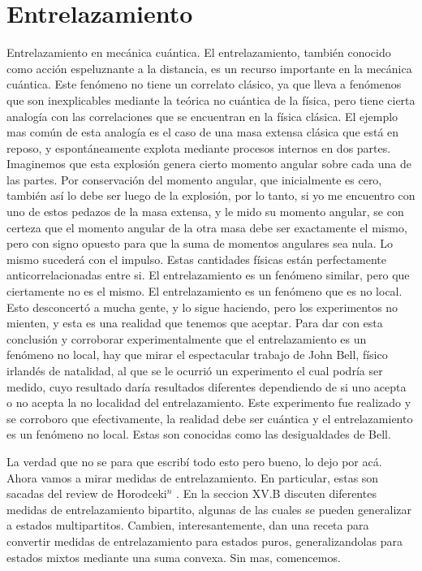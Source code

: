 \chapter{Entrelazamiento}
\label{ch2_entrelazamiento}


\pagestyle{fancy}
\fancyhf{}
\fancyhead[LE]{\nouppercase{\rightmark\hfill}}
\fancyhead[RO]{\nouppercase{\leftmark\hfill}}
\fancyfoot[LE,RO]{\hfill\thepage\hfill}

Entrelazamiento en mecánica cuántica. El entrelazamiento, también conocido como acción espeluznante a la distancia, es un recurso importante en la mecánica cuántica. Este fenómeno no tiene un correlato clásico, ya que lleva a fenómenos que son inexplicables mediante la teórica no cuántica de la física, pero tiene cierta analogía con las correlaciones que se encuentran en la física clásica. El ejemplo mas común de esta analogía es el caso de una masa extensa clásica que está en reposo, y espontáneamente explota mediante procesos internos en dos partes. Imaginemos que esta explosión genera cierto momento angular sobre cada una de las partes. Por conservación del momento angular, que inicialmente es cero, también así lo debe ser luego de la explosión, por lo tanto, si yo me encuentro con uno de estos pedazos de la masa extensa, y le mido su momento angular, se con certeza que el momento angular de la otra masa debe ser exactamente el mismo, pero con signo opuesto para que la suma de momentos angulares sea nula. Lo mismo sucederá con el impulso. Estas cantidades físicas están perfectamente anticorrelacionadas entre si. El entrelazamiento es un fenómeno similar, pero que ciertamente no es el mismo. El entrelazamiento es un fenómeno que es no local. Esto desconcertó a mucha gente, y lo sigue haciendo, pero los experimentos no mienten, y esta es una realidad que tenemos que aceptar. Para dar con esta conclusión y corroborar experimentalmente que el entrelazamiento es un fenómeno no local, hay que mirar el espectacular trabajo de John Bell, físico irlandés de natalidad, al que se le ocurrió un experimento el cual podría ser medido, cuyo resultado daría resultados diferentes dependiendo de si uno acepta o no acepta la no localidad del entrelazamiento. Este experimento fue realizado y se corroboro que efectivamente, la realidad debe ser cuántica y el entrelazamiento es un fenómeno no local. Estas son conocidas como las desigualdades de Bell. 

La verdad que no se para que escribí todo esto pero bueno, lo dejo por acá. Ahora vamos a mirar medidas de entrelazamiento. En particular, estas son sacadas del review de Horodceki$^n$ \cite{quantumentanglementhorodecki}. En la seccion XV.B discuten diferentes medidas de entrelazamiento bipartito, algunas de las cuales se pueden generalizar a estados multipartitos. Cambien, interesantemente, dan una receta para convertir medidas de entrelazamiento para estados puros, generalizandolas para estados mixtos mediante una suma convexa. Sin mas, comencemos.
